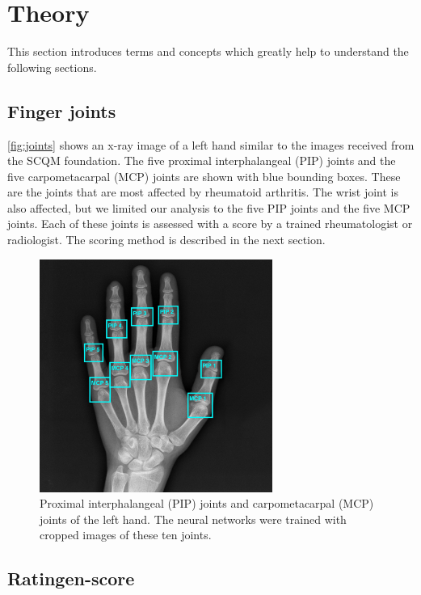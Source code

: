 \documentclass[12pt]{article}
\begin{document}
\newpage

\section{Theory}
\label{sec:theory}
This section introduces terms and concepts which greatly help to understand the following sections.

\subsection{Finger joints}
\label{subsec:joints}

\autoref{fig:joints} shows an x-ray image of a left hand similar to the images received from the SCQM foundation. The five proximal interphalangeal (PIP) joints and the five carpometacarpal (MCP) joints are shown with blue bounding boxes. These are the joints that are most affected by rheumatoid arthritis. The wrist joint is also affected, but we limited our analysis to the five PIP joints and the five MCP joints. Each of these joints is assessed with a score by a trained rheumatologist or radiologist. The scoring method is described in the next section.

\begin{figure}[ht]
\includegraphics[width=3in]{joints}	
\caption{Proximal interphalangeal (PIP) joints and carpometacarpal  (MCP) joints of the left hand. The neural networks were trained with cropped images of these ten joints.}
\label{fig:joints}
\end{figure}

\subsection{Ratingen-score}
\label{subsec:ratingen}
\end{document}
